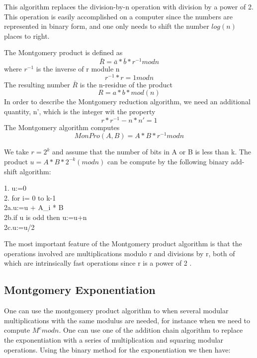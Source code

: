 This algorithm replaces the division-by-n operation with division by a power of 2. This operation is easily accomplished on a computer since the numbers are represented in binary form\cite{highspeedrsa}, and one only needs to shift the number $log(n)$ places to right.

The Montgomery product is defined as
\begin{equation}
    \bar{R}= \bar{a} * \bar{b} * r^{-1} mod n
\end{equation}
where $r^{-1}$ is the inverse of r module n
\begin{equation}
    r^{-1}*r = 1 mod n
\end{equation}
The resulting number $\bar{R}$ is the n-residue of the product
\begin{equation}
    R= a * b * mod (n)
\end{equation}
In order to describe the Montgomery reduction algorithm, we need an additional quantity, n', which is the integer wit the property 
\begin{equation}
    r * r^{-1} - n * n' =1
\end{equation}
The Montgomery algorithm computes
\begin{equation}
    MonPro(A,B) = A * B * r^{-1}mod n
\end{equation}

We take $r=2^k$ and assume that the number of bits in A or B is less than k. The product $u = A * B * 2^{-k}(mod n)$ can be compute by the following binary add-shift algorithm:\\
\begin{algorithm}[H]

    1. u:=0\\
    2. for i= 0 to k-1\\
    2a.\quad u:=u + A_i * B\\
    2b.\quad if u is odd then u:=u+n\\
    2c.\quad u:=u/2\\
\end{algorithm}
The most important feature of the Montgomery product algorithm is that the operations involved are multiplications modulo r and divisions by r, both of which are intrinsically fast operations since r is a power of 2 \cite{highspeedrsa}.


\subsection{Montgomery Exponentiation}
One can use the montgomery product algorithm to when several modular multiplications with the same modulus are needed, for instance when we need to compute $M^e mod n$. One can use one of the addition chain algorithm to replace the exponentiation with a series of multiplication and squaring modular operations. Using the binary method for the exponentiation we then have:

